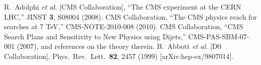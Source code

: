 \documentclass{cmspaper}
\begin{document}
\begin{thebibliography}{0}
  R.~Adolphi {\it et al.}  [CMS Collaboration],
  ``The CMS experiment at the CERN LHC,''
  JINST {\bf 3}, S08004 (2008).
  CMS Collaboration,
  ``The CMS physics reach for searches at 7 TeV,''
  CMS-NOTE-2010-008 (2010).
 CMS Collaboration,
 ``CMS Search Plans and Sensitivity to New Physics using Dijets,''
 CMS-PAS-SBM-07-001 (2007), and references on the theory therein.
  B.~Abbott {\it et al.}  [D0 Collaboration],
  Phys.\ Rev.\ Lett.\  {\bf 82}, 2457 (1999)
  [arXiv:hep-ex/9807014].

\end{thebibliography}
\end{document}
